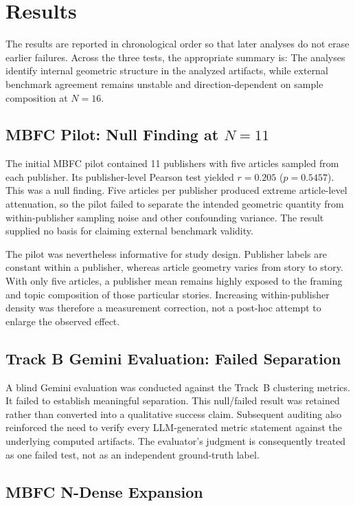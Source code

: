 \section{Results}

The results are reported in chronological order so that later analyses do not erase earlier
failures. Across the three tests, the appropriate summary is: The analyses identify internal
geometric structure in the analyzed artifacts, while external benchmark agreement remains
unstable and direction-dependent on sample composition at
$N=16$.

\subsection{MBFC Pilot: Null Finding at $N=11$}

The initial MBFC pilot contained 11 publishers with five articles sampled from each publisher.
Its publisher-level Pearson test yielded $r=0.205$ ($p=0.5457$). This was a null finding. Five
articles per publisher produced extreme article-level attenuation, so the pilot failed to
separate the intended geometric quantity from within-publisher sampling noise and other
confounding variance. The result supplied no basis for claiming external benchmark validity.

The pilot was nevertheless informative for study design. Publisher labels are constant within
a publisher, whereas article geometry varies from story to story. With only five articles, a
publisher mean remains highly exposed to the framing and topic composition of those particular
stories. Increasing within-publisher density was therefore a measurement correction, not a
post-hoc attempt to enlarge the observed effect.

\subsection{Track B Gemini Evaluation: Failed Separation}

A blind Gemini evaluation was conducted against the Track~B clustering metrics. It failed to
establish meaningful separation. This null/failed result was retained rather than converted into
a qualitative success claim. Subsequent auditing also reinforced the need to verify every
LLM-generated metric statement against the underlying computed artifacts. The evaluator's
judgment is consequently treated as one failed test, not as an independent ground-truth label.

\subsection{MBFC N-Dense Expansion}

